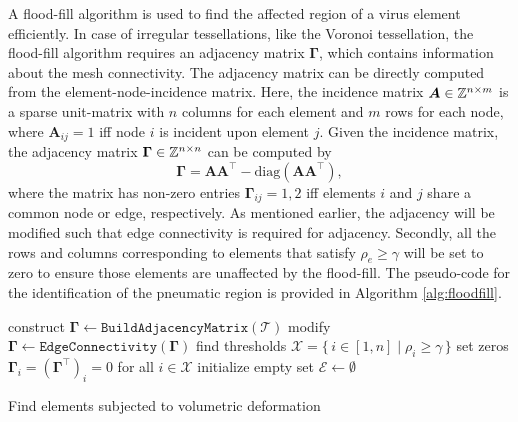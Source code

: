 A flood-fill algorithm is used \cite{Chartrand1977Jan} to find the affected region of a virus element efficiently. In case of irregular tessellations, like the Voronoi tessellation, the flood-fill algorithm requires an adjacency matrix $\boldsymbol{\Gamma}$, which contains information about the mesh connectivity. The adjacency matrix can be directly computed from the element-node-incidence matrix. Here, the incidence matrix $\boldsymbol{A} \in \mathbb{Z}^{n\times m}$ is a sparse unit-matrix with $n$ columns for each element and $m$ rows for each node, where $\boldsymbol{A}_{ij} = 1$ iff node $i$ is incident upon element $j$. Given the incidence matrix, the adjacency matrix $\boldsymbol{\Gamma}\in \mathbb{Z}^{n\times n}$ can be computed by
%
\begin{equation}
\boldsymbol{\Gamma} = \boldsymbol{A}\boldsymbol{A}^\top - \text{diag}(\boldsymbol{A}\boldsymbol{A}^\top), \label{eq:adjecency}
\end{equation}
%
where the matrix has non-zero entries $\boldsymbol{\Gamma}_{ij} = 1,2$ iff elements $i$ and $j$ share a common node or edge, respectively. As mentioned earlier, the adjacency will be modified such that edge connectivity is required for adjacency. Secondly, all the rows and columns corresponding to elements that satisfy $\rho_e \ge \gamma$ will be set to zero to ensure those elements are unaffected by the flood-fill. The pseudo-code for the identification of the pneumatic region is provided in Algorithm \ref{alg:floodfill}.

\begin{algorithm}[!t]
    construct $\boldsymbol{\Gamma}  \gets {\texttt{BuildAdjacencyMatrix}}(\mathcal{T})$\;
    modify $\boldsymbol{\Gamma}  \gets {\texttt{EdgeConnectivity}}(\boldsymbol{\Gamma})$\;
    find thresholds $\mathcal{X} = \{\, i \in [1,n] \;|\; \rho_i \ge \gamma \,\}$\;
    set zeros $\boldsymbol{\Gamma}_i = (\boldsymbol{\Gamma}^\top)_i = 0$ for all $i \in  \mathcal{X}$\;
    initialize empty set $\mathcal{E} \gets \emptyset$\;
    \caption{Find elements subjected to volumetric deformation \label{alg:floodfill}}
\end{algorithm}

